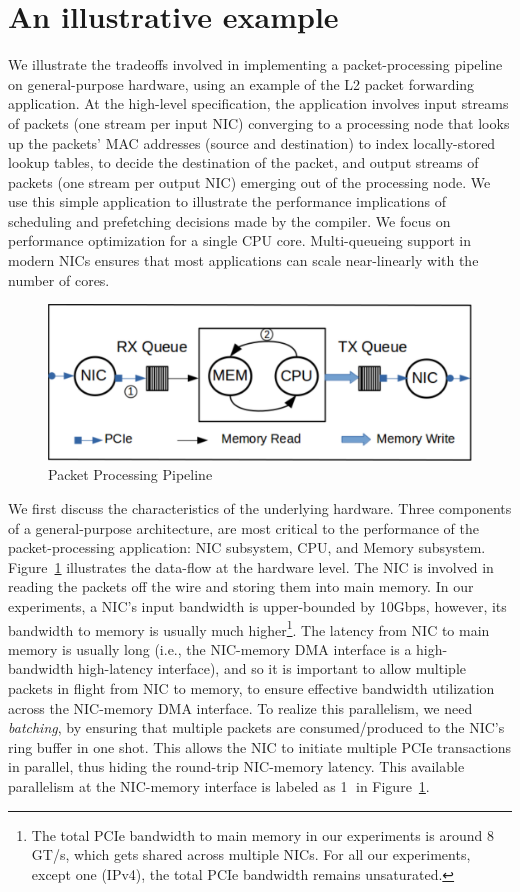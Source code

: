 \section{An illustrative example}
\label{Buildingblocks}
We illustrate the tradeoffs involved in implementing a packet-processing
pipeline on general-purpose
hardware, using an example of the L2 packet forwarding application.
At the high-level specification, the application involves input streams
of packets (one stream per input NIC) converging
to a processing node that looks up the packets' MAC addresses (source
and destination)
to index locally-stored lookup tables, to decide the destination of the packet, and
output streams of packets (one stream per output NIC) emerging out of
the processing node. We use
this simple application to illustrate the performance implications of
scheduling and prefetching decisions made by the compiler. We focus on performance
optimization for a single CPU core. Multi-queueing support in modern NICs
ensures that most applications can scale near-linearly with the number of cores.
\begin{figure}[ht]
\includegraphics[width = \linewidth]{Figures/queuing.png}
\caption{Packet Processing Pipeline}
\label{fig:overviewfigure}
\end{figure}


We first discuss the characteristics of the underlying hardware.
Three components of a general-purpose architecture, are most critical to the performance of the
packet-processing
application: NIC subsystem, CPU, and Memory subsystem. Figure~\ref{fig:overviewfigure}
illustrates the data-flow at the hardware level. The NIC is involved in reading the packets
off the wire and storing them into main memory. In our experiments, a NIC's input bandwidth
is upper-bounded by 10Gbps, however, its bandwidth to memory is usually much higher\footnote{The
total PCIe bandwidth to main memory in our experiments
is around 8 GT/s, which gets shared across multiple NICs. For
all our experiments, except one (IPv4), the total PCIe bandwidth remains unsaturated.}. The latency
from NIC to main memory is usually long (i.e., the NIC-memory DMA interface is a high-bandwidth
high-latency interface), and so it is important to allow multiple
packets in flight from NIC to memory, to ensure effective bandwidth utilization across the
NIC-memory DMA interface. To realize this parallelism, we need {\em batching}, by ensuring
that multiple
packets are consumed/produced to the NIC's ring buffer in one shot. This allows the NIC to initiate
multiple PCIe transactions in parallel, thus hiding the round-trip NIC-memory latency. This
available parallelism at the NIC-memory interface is labeled as \textcircled{1}
in Figure~\ref{fig:overviewfigure}.

